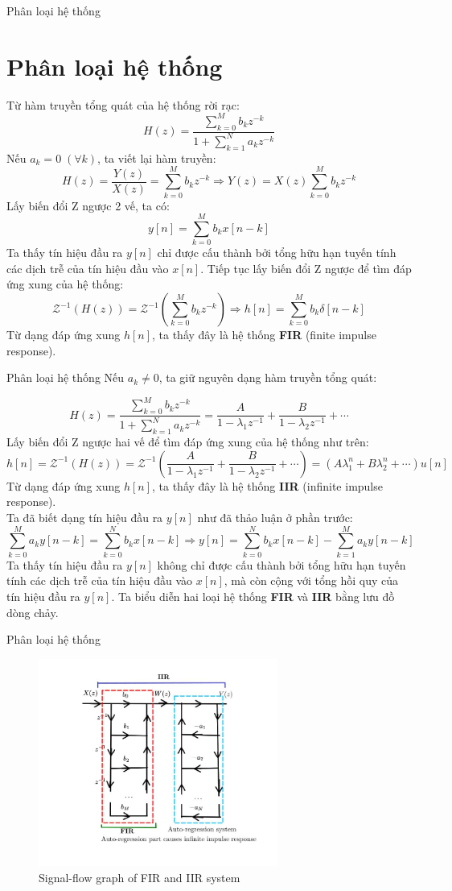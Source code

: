 \documentclass[8pt]{beamer}
\begin{document}
\begin{frame}{Phân loại hệ thống}
\section{Phân loại hệ thống}
Từ hàm truyền tổng quát của hệ thống rời rạc:
$$H(z)=\frac{\sum_{k=0}^{M}b_{k}z^{-k}}{1+\sum_{k=1}^{N}a_{k}z^{-k}}$$
Nếu $a_{k}=0\; (\forall k)$, ta viết lại hàm truyền: $$H(z)=\frac{Y(z)}{X(z)}=\sum_{k=0}^{M}b_{k}z^{-k}\Rightarrow Y(z)=X(z)\sum_{k=0}^{M}b_{k}z^{-k}$$
Lấy biến đổi Z ngược 2 vế, ta có:
$$y[n]=\sum_{k=0}^{M}b_{k}x[n-k]$$
Ta thấy tín hiệu đầu ra $y[n]$ chỉ được cấu thành bởi tổng \alert{hữu hạn} tuyến tính các dịch trễ của tín hiệu đầu vào $x[n]$. Tiếp tục lấy biến đổi Z ngược để tìm đáp ứng xung của hệ thống:
$$\mathscr{Z}^{-1}(H(z))=\mathscr{Z}^{-1}\left(\sum_{k=0}^{M}b_{k}z^{-k}\right)\Rightarrow h[n]=\sum_{k=0}^{M}b_{k}\delta[n-k]$$
Từ dạng đáp ứng xung $h[n]$, ta thấy đây là hệ thống \textbf{FIR} (finite impulse response).
\end{frame}
\begin{frame}{Phân loại hệ thống}
Nếu $a_{k}\neq 0$, ta giữ nguyên dạng hàm truyền tổng quát:

$$H(z)=\frac{\sum_{k=0}^{M}b_{k}z^{-k}}{1+\sum_{k=1}^{N}a_{k}z^{-k}}=\frac{A}{1-\lambda_{1}z^{-1}}+\frac{B}{1-\lambda_{2}z^{-1}}+\cdots$$
Lấy biến đổi Z ngược hai vế để tìm đáp ứng xung của hệ thống như trên:
$$h[n]=\mathscr{Z}^{-1}(H(z))=\mathscr{Z}^{-1}\left(\frac{A}{1-\lambda_{1}z^{-1}}+\frac{B}{1-\lambda_{2}z^{-1}}+\cdots\right)=(A\lambda_{1}^{n}+B\lambda_{2}^{n}+\cdots)u[n]$$
Từ dạng đáp ứng xung $h[n]$, ta thấy đây là hệ thống \textbf{IIR} (infinite impulse response).
\\ Ta đã biết dạng tín hiệu đầu ra $y[n]$ như đã thảo luận ở phần trước:
$$\sum_{k=0}^{M}a_{k}y[n-k]=\sum_{k=0}^{N}b_{k}x[n-k]\Rightarrow y[n]=\sum_{k=0}^{N}b_{k}x[n-k]-\sum_{k=1}^{M}a_{k}y[n-k]$$
Ta thấy tín hiệu đầu ra $y[n]$ không chỉ được cấu thành bởi tổng hữu hạn tuyến tính các dịch trễ  của tín hiệu đầu vào $x[n]$, mà còn cộng với tổng \alert{hồi quy của tín hiệu đầu ra $y[n]$}. Ta biểu diễn hai loại hệ thống \textbf{FIR} và \textbf{IIR} bằng lưu đồ dòng chảy.
\end{frame}
\begin{frame}{Phân loại hệ thống}
\begin{figure}[h]
			\includegraphics[width=0.7\textwidth]{7.jpg}
			\caption{Signal-flow graph of FIR and IIR system}			\label{fig:re7}

		\end{figure}
\end{frame}
\end{document}

